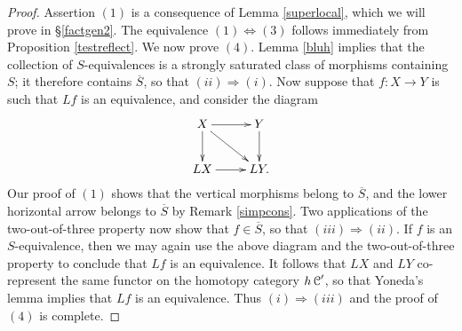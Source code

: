 \begin{proof}
Assertion $(1)$ is a consequence of Lemma \ref{superlocal}, which we will prove in \S \ref{factgen2}. The equivalence $(1) \Leftrightarrow (3)$ follows immediately from Proposition \ref{testreflect}. We now prove $(4)$. Lemma \ref{bluh} implies that the collection of $S$-equivalences
is a strongly saturated class of morphisms containing $S$; it therefore contains $\overline{S}$, so that $(ii) \Rightarrow (i)$. Now suppose that $f: X \rightarrow Y$ is such that $Lf$ is an equivalence,
and consider the diagram 
$$ \xymatrix{ X \ar[r] \ar[dr] \ar[d] & Y \ar[d] \\
LX \ar[r] & LY. }$$
Our proof of $(1)$ shows that the vertical morphisms belong to $\overline{S}$, and the
lower horizontal arrow belongs to $\overline{S}$ by Remark \ref{simpcons}. Two applications of the two-out-of-three property now show that $f \in \overline{S}$, so that $(iii) \Rightarrow (ii)$. If $f$ is an $S$-equivalence, then
we may again use the above diagram and the two-out-of-three property to conclude that $Lf$ is an equivalence. It follows that $LX$ and $LY$ co-represent the same functor on the homotopy category $h\operatorname{\mathcal{C}}'$, so that Yoneda's lemma implies that $Lf$ is an equivalence.
Thus $(i) \Rightarrow (iii)$ and the proof of $(4)$ is complete.


\end{proof}
